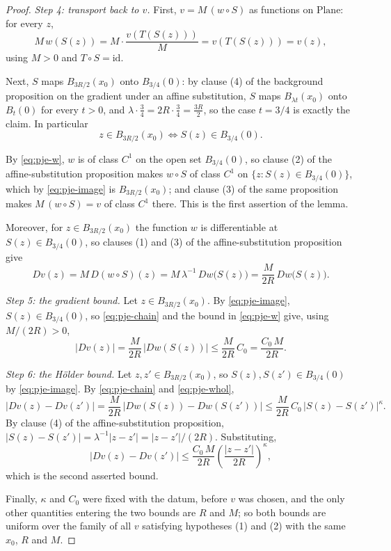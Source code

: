 \begin{proof}
\medskip\noindent\emph{Step 4: transport back to $v$.}
First, $v=M\,(w\circ S)$ as functions on $\mathrm{Plane}$: for every $z$,
\[
  M\,w(S(z))=M\cdot\frac{v(T(S(z)))}{M}=v(T(S(z)))=v(z),
\]
using $M>0$ and $T\circ S=\mathrm{id}$.

Next, $S$ maps $B_{3R/2}(x_0)$ onto $B_{3/4}(0)$: by clause (4) of the background proposition on
the gradient under an affine substitution, $S$ maps $B_{\lambda t}(x_0)$ onto $B_t(0)$ for every
$t>0$, and $\lambda\cdot\tfrac34=2R\cdot\tfrac34=\tfrac{3R}{2}$, so the case $t=3/4$ is exactly
the claim.  In particular
\begin{equation}\label{eq:pje-image}
  z\in B_{3R/2}(x_0)\iff S(z)\in B_{3/4}(0).
\end{equation}

By \eqref{eq:pje-w}, $w$ is of class $C^{1}$ on the open set $B_{3/4}(0)$, so clause (2) of the
affine-substitution proposition makes $w\circ S$ of class $C^{1}$ on
$\{z:S(z)\in B_{3/4}(0)\}$, which by \eqref{eq:pje-image} is $B_{3R/2}(x_0)$; and clause (3) of
the same proposition makes $M\,(w\circ S)=v$ of class $C^{1}$ there.  This is the first assertion
of the lemma.

Moreover, for $z\in B_{3R/2}(x_0)$ the function $w$ is differentiable at $S(z)\in B_{3/4}(0)$, so
clauses (1) and (3) of the affine-substitution proposition give
\begin{equation}\label{eq:pje-chain}
  Dv(z)=M\,D(w\circ S)(z)=M\,\lambda^{-1}\,Dw\bigl(S(z)\bigr)=\frac{M}{2R}\,Dw\bigl(S(z)\bigr).
\end{equation}

\medskip\noindent\emph{Step 5: the gradient bound.}
Let $z\in B_{3R/2}(x_0)$.  By \eqref{eq:pje-image}, $S(z)\in B_{3/4}(0)$, so \eqref{eq:pje-chain}
and the bound in \eqref{eq:pje-w} give, using $M/(2R)>0$,
\[
  \lvert Dv(z)\rvert=\frac{M}{2R}\,\bigl\lvert Dw(S(z))\bigr\rvert\le\frac{M}{2R}\,C_0
  =\frac{C_0\,M}{2R}.
\]

\medskip\noindent\emph{Step 6: the H\"older bound.}
Let $z,z'\in B_{3R/2}(x_0)$, so $S(z),S(z')\in B_{3/4}(0)$ by \eqref{eq:pje-image}.  By
\eqref{eq:pje-chain} and \eqref{eq:pje-whol},
\[
  \lvert Dv(z)-Dv(z')\rvert
  =\frac{M}{2R}\,\bigl\lvert Dw(S(z))-Dw(S(z'))\bigr\rvert
  \le\frac{M}{2R}\,C_0\,\bigl\lvert S(z)-S(z')\bigr\rvert^{\kappa}.
\]
By clause (4) of the affine-substitution proposition,
$\lvert S(z)-S(z')\rvert=\lambda^{-1}\lvert z-z'\rvert=\lvert z-z'\rvert/(2R)$.  Substituting,
\[
  \lvert Dv(z)-Dv(z')\rvert
  \le\frac{C_0\,M}{2R}\left(\frac{\lvert z-z'\rvert}{2R}\right)^{\kappa},
\]
which is the second asserted bound.

\medskip\noindent Finally, $\kappa$ and $C_0$ were fixed with the datum, before $v$ was chosen,
and the only other quantities entering the two bounds are $R$ and $M$; so both bounds are
uniform over the family of all $v$ satisfying hypotheses (1) and (2) with the same $x_0$, $R$
and $M$.
\end{proof}
